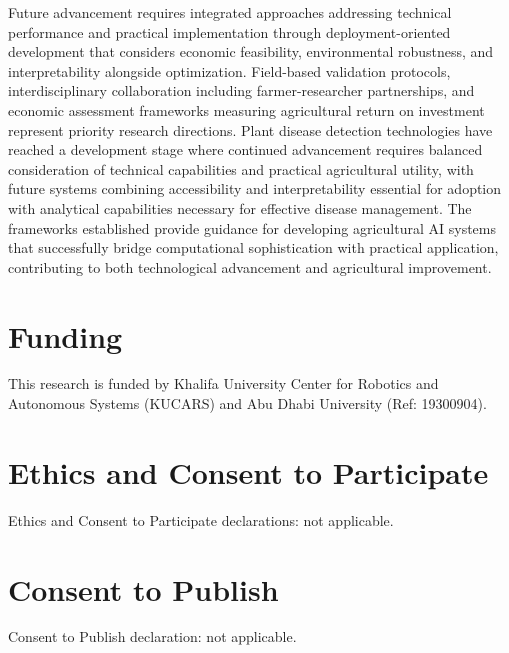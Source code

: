 \documentclass[sn-mathphys]{sn-jnl}
\theoremstyle{thmstyleone}%
\theoremstyle{thmstyletwo}%
\theoremstyle{thmstylethree}%
\begin{document}
Future advancement requires integrated approaches addressing technical performance and practical implementation through deployment-oriented development that considers economic feasibility, environmental robustness, and interpretability alongside optimization. Field-based validation protocols, interdisciplinary collaboration including farmer-researcher partnerships, and economic assessment frameworks measuring agricultural return on investment represent priority research directions. Plant disease detection technologies have reached a development stage where continued advancement requires balanced consideration of technical capabilities and practical agricultural utility, with future systems combining accessibility and interpretability essential for adoption with analytical capabilities necessary for effective disease management. The frameworks established provide guidance for developing agricultural AI systems that successfully bridge computational sophistication with practical application, contributing to both technological advancement and agricultural improvement.


\section*{Funding}
This research is funded by Khalifa University Center for Robotics and Autonomous Systems (KUCARS) and Abu Dhabi University (Ref: 19300904).

\section*{Ethics and Consent to Participate}
Ethics and Consent to Participate declarations: not applicable.

\section*{Consent to Publish}
Consent to Publish declaration: not applicable.
\end{document}
